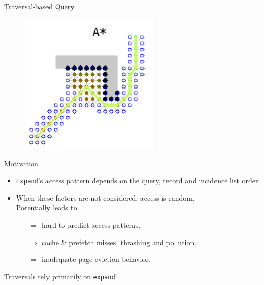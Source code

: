 \documentclass[rgb]{beamer}
\begin{document}
    \begin{frame}{Traversal-based Query}
        \begin{figure}
            \begin{center}
            \includegraphics[keepaspectratio, height=0.6\textheight, width=0.6\textwidth]{img/astar.png}
            \end{center}
        \end{figure}
    \end{frame}

    
     \begin{frame}{Motivation}    
        \begin{itemize}
            \item \texttt{Expand}'s access pattern depends on the query, record and incidence list order. \\ [2em]
            \item When these factors are not considered, access is random. \\ [1em]
            Potentially leads to \\ [0.5em]
               \begin{itemize}
                    \item[$\Rightarrow$] hard-to-predict access patterns.
                    \item[$\Rightarrow$] cache \& prefetch misses, thrashing and pollution.
                    \item[$\Rightarrow$] inadequate page eviction behavior. \\ [2em]
                \end{itemize}
        \end{itemize}
        \alert{Traversals rely primarily on \texttt{expand}!}
    \end{frame}
    
\end{document}
